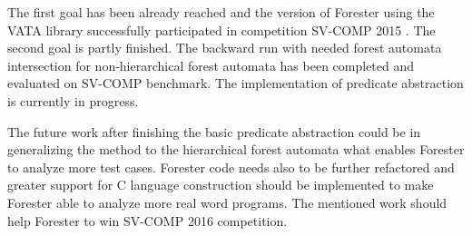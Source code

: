 \documentclass[fleqn,11pt]{ExcelAtFIT} %
\begin{document}
The first goal has been already reached and the version of Forester using the VATA library successfully participated in competition SV-COMP 2015 \cite{www:svcomp}.
The second goal is partly finished.
The backward run with needed forest automata intersection for non-hierarchical forest automata has been completed and evaluated on SV-COMP benchmark.
The implementation of predicate abstraction is currently in progress.

The future work after finishing the basic predicate abstraction could be in generalizing the method to the hierarchical forest automata
what enables Forester to analyze more test cases.
Forester code needs also to be further refactored and greater support for C language construction should be implemented to make Forester able
to analyze more real word programs.
The mentioned work should help Forester to win SV-COMP 2016 competition.






\end{document}

